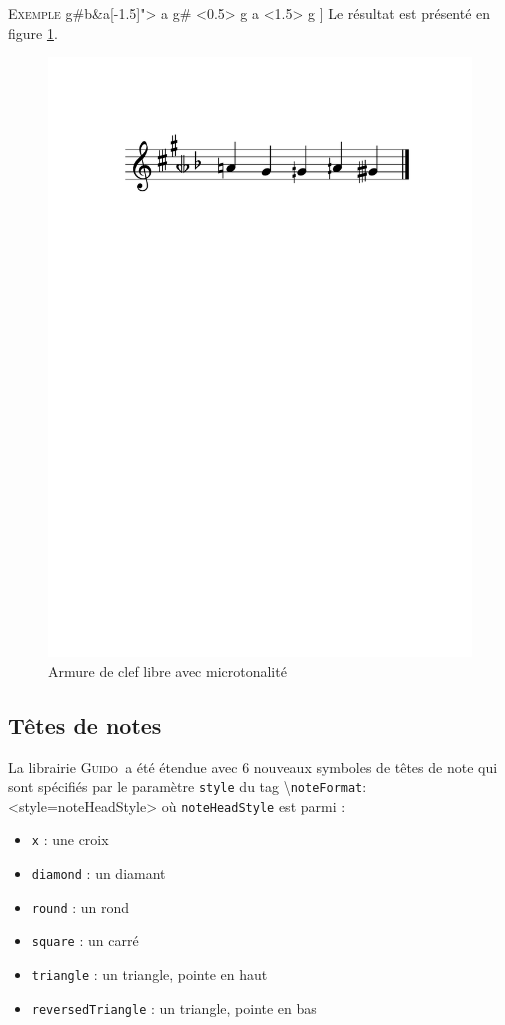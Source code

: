 \documentclass{article}
\newenvironment{gmncode}	{\vspace{-2mm}\small\verbatim}{\endverbatim\vspace{-2mm}}
\newcommand{\guido}			{\textsc{Guido}}
\newcommand{\code}[1]		{{\small \texttt{#1}}}
\newcommand{\guidotag}[1]	{\textbackslash\code{#1}}
\newcommand{\exemple}		{\vspace{2mm}\hspace*{-6mm}\textsc{Exemple}}
\begin{document}
\exemple
\begin{gmncode}
[
  \key<"free=c[1.5]g#b&a[-1.5]"> a g# 
  \alter<0.5> g  a \alter<1.5> g 
]
\end{gmncode}
Le résultat est présenté en figure \ref{fig:freekey}.
\begin{figure}[h]
\centering
\includegraphics[width=0.75\columnwidth]{img/partitions/freekey.pdf}
\caption{Armure de clef libre avec microtonalité}
\label{fig:freekey}
\end{figure}


\subsection{Têtes de notes}\label{subsec:tetes_notes}
%
La librairie \guido\ a été étendue avec 6 nouveaux symboles de têtes de note qui sont spécifiés par le paramètre \code{style} du tag \guidotag{noteFormat}:
\begin{gmncode}
  \noteFormat<style=noteHeadStyle>
\end{gmncode}
où \code{noteHeadStyle} est parmi :
\begin{itemize}
    \item \code{x} : une croix
    \item \code{diamond} : un diamant
    \item \code{round} : un rond
    \item \code{square} : un carré
    \item \code{triangle} : un triangle, pointe en haut
    \item \code{reversedTriangle} : un triangle, pointe en bas
\end{itemize} 
\end{document}

